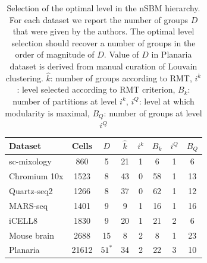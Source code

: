 \documentclass[10pt]{article}
\begin{document}
\begin{table}[h!]
\centering
 \begin{tabular}{|| l c c c c c c c ||}
 \hline
 \textbf{Dataset} & \textbf{Cells} & \textbf{$D$}  & \textbf{$\hat{k}$} & \textbf{$i^k$} & \textbf{$B_k$} & \textbf{$i^Q$} & \textbf{$B_Q$} \\ [0.5ex] 

 \hline\hline
 sc-mixology \cite{Tian_2019} & 860 & 5  & 21 & 1 & 6 & 1 & 6 \\ 
\hline
 Chromium 10x \cite{mereu_2020} & 1523 & 8  & 43 & 0 & 58 & 1 & 13 \\
 \hline
 Quartz-seq2 \cite{mereu_2020} & 1266 & 8  & 37 & 0 & 62 & 1 & 12 \\
 \hline
 MARS-seq \cite{mereu_2020} & 1401 & 9  & 9 & 1 & 16 & 1 & 16 \\
 \hline
 iCELL8 \cite{mereu_2020} & 1830 & 9  & 20 & 1 & 21 & 2 & 6 \\
 \hline
 Mouse brain \cite{Gracia_Villacampa_2020} & 2688 & 15  & 8 & 2 & 8 & 1 & 23 \\
 \hline
 Planaria \cite{plass_2018} & 21612 & $51^\ast$ & 34 & 2 & 22 & 3 & 10 \\
 \hline
\end{tabular}
\caption{Selection of the optimal level in the nSBM hierarchy. For each dataset we report the number of groups $D$ that were given by the authors. The optimal level selection should recover a number of groups in the order of magnitude of $D$. Value of $D$ in Planaria dataset is derived from manual curation of Louvain clustering. $\hat{k}$:  number of groups according to RMT, $i^k$: level selected according to RMT criterion, $B_k$: number of partitions at level $i^k$, $i^Q$: level at which modularity is maximal, $B_Q$: number of groups at level $i^Q$}
\label{table_optimal}
\end{table}
\end{document}
